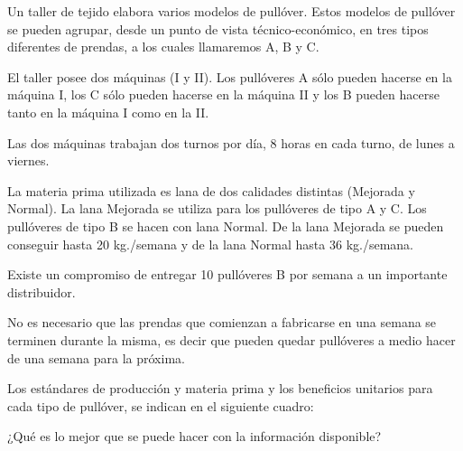 \documentclass[../main.tex]{subfiles}
\begin{document}
        \begin{exercise} %
            Un taller de tejido elabora varios modelos de pullóver. Estos modelos de pullóver se pueden agrupar, desde un punto de vista técnico-económico, en tres tipos diferentes de prendas, a los cuales llamaremos A, B y C.

            El taller posee dos máquinas (I y II). Los pullóveres A sólo pueden hacerse en la máquina I, los C sólo pueden hacerse en la máquina II y los B pueden hacerse tanto en la máquina I como en la II.

            Las dos máquinas trabajan dos turnos por día, 8 horas en cada turno, de lunes a viernes.

            La materia prima utilizada es lana de dos calidades distintas (Mejorada y Normal). La lana Mejorada se utiliza para los pullóveres de tipo A y C. Los pullóveres de tipo B se hacen con lana Normal. De la lana Mejorada se pueden conseguir hasta 20 kg./semana y de la lana Normal hasta 36 kg./semana.

            Existe un compromiso de entregar 10 pullóveres B por semana a un importante distribuidor.

            No es necesario que las prendas que comienzan a fabricarse en una semana se terminen durante la misma, es decir que pueden quedar pullóveres a medio hacer de una semana para la próxima.

            Los estándares de producción y materia prima y los beneficios unitarios para cada tipo de pullóver, se indican en el siguiente cuadro:
            
            ¿Qué es lo mejor que se puede hacer con la información disponible?


\end{exercise}
\end{document}
